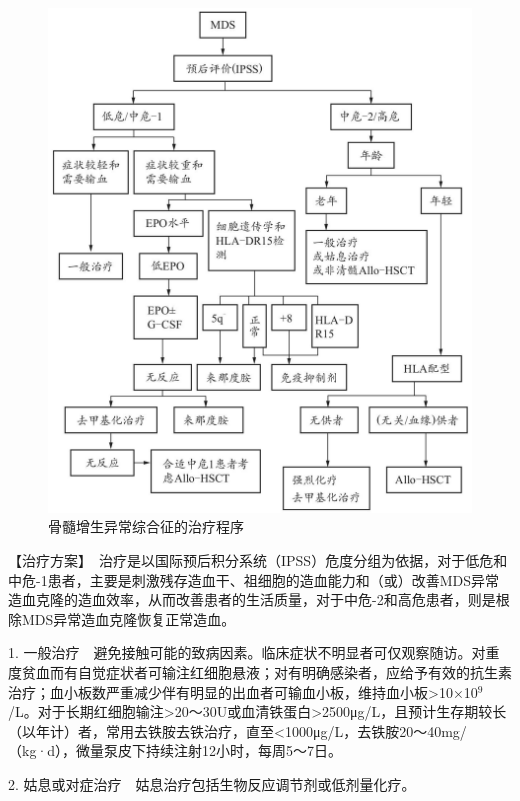 \begin{figure}[!htbp]
 \centering
 \includegraphics{./images/Image00150.jpg}
 \captionsetup{justification=centering}
 \caption{骨髓增生异常综合征的治疗程序}
 \label{fig5-1-17}
  \end{figure} 

【治疗方案】　治疗是以国际预后积分系统（IPSS）危度分组为依据，对于低危和中危-1患者，主要是刺激残存造血干、祖细胞的造血能力和（或）改善MDS异常造血克隆的造血效率，从而改善患者的生活质量，对于中危-2和高危患者，则是根除MDS异常造血克隆恢复正常造血。

1.
一般治疗　避免接触可能的致病因素。临床症状不明显者可仅观察随访。对重度贫血而有自觉症状者可输注红细胞悬液；对有明确感染者，应给予有效的抗生素治疗；血小板数严重减少伴有明显的出血者可输血小板，维持血小板\textgreater{}10×10$^{9}$
/L。对于长期红细胞输注\textgreater{}20～30U或血清铁蛋白\textgreater{}2500μg/L，且预计生存期较长（以年计）者，常用去铁胺去铁治疗，直至<1000μg/L，去铁胺20～40mg/（kg·d），微量泵皮下持续注射12小时，每周5～7日。

2. 姑息或对症治疗　姑息治疗包括生物反应调节剂或低剂量化疗。

